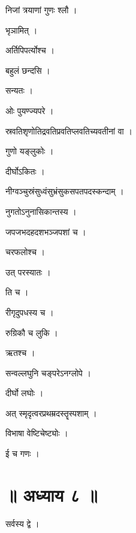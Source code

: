 \documentclass[10pt, openany]{book}
\begin{document}
\noindent निजां त्रयाणां गुणः श्लौ ।

\noindent भृञामित् ।

\noindent अर्तिपिपर्त्योश्च ।

\noindent बहुलं छन्दसि ।

\noindent सन्यतः ।

\noindent ओः पुयण्ज्यपरे ।

\noindent स्रवतिश‍ृणोतिद्रवतिप्रवतिप्लवतिच्यवतीनां वा ।

\noindent गुणो यङ्लुकोः ।

\noindent दीर्घोऽकितः ।

\noindent नीग्वञ्चुस्रंसुध्वंसुभ्रंसुकसपतपदस्कन्दाम् ।

\noindent नुगतोऽनुनासिकान्तस्य ।

\noindent जपजभदहदशभञ्जपशां च ।

\noindent चरफलोश्च ।

\noindent उत् परस्यातः ।

\noindent ति च ।

\noindent रीगृदुपधस्य च ।

\noindent रुग्रिकौ च लुकि ।

\noindent ऋतश्च ।

\noindent सन्वल्लघुनि चङ्परेऽनग्लोपे ।

\noindent दीर्घो लघोः ।

\noindent अत् स्मृदृत्वरप्रथम्रदस्तॄस्पशाम् ।

\noindent विभाषा वेष्टिचेष्ट्योः ।

\noindent ई च गणः ।

\section*{॥ अध्याय ८ ॥}

\noindent सर्वस्य द्वे ।
\end{document}
